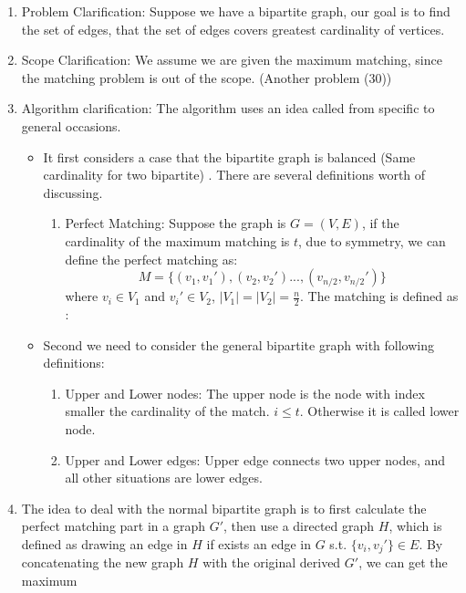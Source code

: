 \documentclass{article}
\begin{document}
\begin{enumerate}[1.]
\item Problem Clarification: Suppose we have a bipartite graph, our goal is to find the set of edges, that the set of edges covers greatest cardinality of vertices.

\item Scope Clarification: We assume we are given the maximum matching, since the matching problem is out of the scope. (Another problem (30))

\item Algorithm clarification: The algorithm uses an idea called from specific to general occasions. 
\begin{itemize}
\item It first considers a case that the bipartite graph is balanced (Same cardinality for two bipartite) . There are several definitions worth of discussing.
	\begin{enumerate}[(1)]
	\item Perfect Matching: Suppose the graph is $G=(V,E)$, if the cardinality of the maximum matching is $t$, due to symmetry, we can define the perfect matching as:
	\[
		M=\{(v_1,v_1'), (v_2, v_2')..., (v_{n/2},v_{n/2}')\}
	\]
	where $v_i \in V_1$ and $v_i' \in V_2$, $|V_1| = |V_2| = \frac{n}{2}$. The matching is defined as :
	\end{enumerate}
\item Second we need to consider the general bipartite graph with following definitions:
	\begin{enumerate}[(1)]
	\item Upper and Lower nodes: The upper node is the node with index smaller the cardinality of the match. $i \leq t$. Otherwise it is called lower node.
	\item Upper and Lower edges: Upper edge connects two upper nodes, and all other situations are lower edges.
	\end{enumerate}
\end{itemize}
\item The idea to deal with the normal bipartite graph is to first calculate the perfect matching part in a graph $G'$, then use a directed graph $H$, which is defined as drawing an edge in $H$ if exists an edge in $G$ s.t. $\{v_i, v_j'\} \in E$. By concatenating the new graph $H$ with the original derived $G'$, we can get the maximum 
\end{enumerate}
\end{document}
